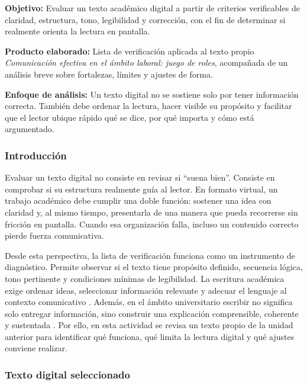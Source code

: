 \begin{portafolioabstract}
	\textbf{Objetivo:} Evaluar un texto académico digital a partir de criterios verificables de claridad, estructura, tono, legibilidad y corrección, con el fin de determinar si realmente orienta la lectura en pantalla.

	\textbf{Producto elaborado:} Lista de verificación aplicada al texto propio \textit{Comunicación efectiva en el ámbito laboral: juego de roles}, acompañada de un análisis breve sobre fortalezas, límites y ajustes de forma.

	\textbf{Enfoque de análisis:} Un texto digital no se sostiene solo por tener información correcta. También debe ordenar la lectura, hacer visible su propósito y facilitar que el lector ubique rápido qué se dice, por qué importa y cómo está argumentado.
\end{portafolioabstract}

\subsubsection{Introducción}

Evaluar un texto digital no consiste en revisar si ``suena bien''. Consiste en comprobar si su estructura realmente guía al lector. En formato virtual, un trabajo académico debe cumplir una doble función: sostener una idea con claridad y, al mismo tiempo, presentarla de una manera que pueda recorrerse sin fricción en pantalla. Cuando esa organización falla, incluso un contenido correcto pierde fuerza comunicativa.

Desde esta perspectiva, la lista de verificación funciona como un instrumento de diagnóstico. Permite observar si el texto tiene propósito definido, secuencia lógica, tono pertinente y condiciones mínimas de legibilidad. La escritura académica exige ordenar ideas, seleccionar información relevante y adecuar el lenguaje al contexto comunicativo \citep{nunezcortesEscrituraAcademicaTeoria2015}. Además, en el ámbito universitario escribir no significa solo entregar información, sino construir una explicación comprensible, coherente y sustentada \citep{correaManualBasicoEscritura2018,vitoriaEscrituraAcademicaFormacion2019}. Por ello, en esta actividad se revisa un texto propio de la unidad anterior para identificar qué funciona, qué limita la lectura digital y qué ajustes conviene realizar.

\subsubsection{Texto digital seleccionado}

